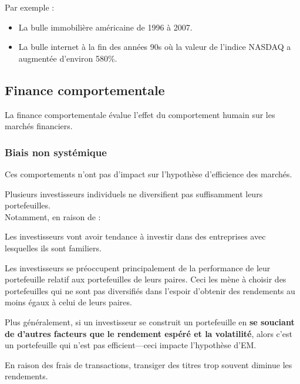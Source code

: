 \documentclass[10pt, french]{article}
\begin{document}
\begin{multicols*}{2}
Par exemple : 
\begin{itemize}
	\item	La bulle immobilière américaine de 1996 à 2007.
	\item	La bulle internet à la fin des années 90s où la valeur de l'indice NASDAQ a augmentée d'environ 580\%.
\end{itemize}


\columnbreak
\subsection{Finance comportementale}
La finance comportementale évalue l'effet du comportement humain sur les marchés financiers.

\subsubsection{Biais non systémique}
Ces comportements n'ont pas d'impact sur l'hypothèse d'efficience des marchés.

\begin{definitionNOHFILLsub}
Plusieurs investisseurs individuels ne diversifient pas suffisamment leurs portefeuilles. \\

Notamment, en raison de : 
\begin{definitionNOHFILLprop}
Les investisseurs vont avoir tendance à investir dans des entreprises avec lesquelles ils sont familiers.
\end{definitionNOHFILLprop}

\begin{definitionNOHFILLprop}
Les investisseurs se préoccupent principalement de la performance de leur portefeuille relatif aux portefeuilles de leurs paires. Ceci les mène à choisir des portefeuilles qui ne sont pas diversifiés dans l'espoir d'obtenir des rendements au moins égaux à celui de leurs paires.
\end{definitionNOHFILLprop}
\end{definitionNOHFILLsub}

Plus généralement, si un investisseur se construit un portefeuille en \textbf{se souciant de d'autres facteurs que le rendement espéré et la volatilité}, alors c'est un portefeuille qui n'est pas efficient---ceci impacte l'hypothèse d'EM.

\begin{definitionNOHFILLsub}
En raison des frais de transactions, transiger des titres trop souvent diminue les rendements. 	\\


\end{definitionNOHFILLsub}
\end{multicols*}
\end{document}
